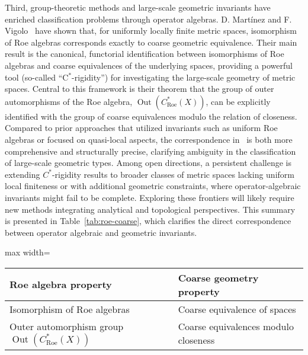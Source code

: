 \documentclass[sigconf]{acmart}
\begin{document}
Third, group-theoretic methods and large-scale geometric invariants have enriched classification problems through operator algebras. D. Martínez and F. Vigolo~\cite{ref52} have shown that, for uniformly locally finite metric spaces, isomorphism of Roe algebras corresponds exactly to coarse geometric equivalence. Their main result is the canonical, functorial identification between isomorphisms of Roe algebras and coarse equivalences of the underlying spaces, providing a powerful tool (so-called ``C$^*$-rigidity'') for investigating the large-scale geometry of metric spaces. Central to this framework is their theorem that the group of outer automorphisms of the Roe algebra, $\operatorname{Out}(C^*_{\mathrm{Roe}}(X))$, can be explicitly identified with the group of coarse equivalences modulo the relation of closeness. Compared to prior approaches that utilized invariants such as uniform Roe algebras or focused on quasi-local aspects, the correspondence in~\cite{ref52} is both more comprehensive and structurally precise, clarifying ambiguity in the classification of large-scale geometric types. Among open directions, a persistent challenge is extending $C^*$-rigidity results to broader classes of metric spaces lacking uniform local finiteness or with additional geometric constraints, where operator-algebraic invariants might fail to be complete. Exploring these frontiers will likely require new methods integrating analytical and topological perspectives. This summary is presented in Table~\ref{tab:roe-coarse}, which clarifies the direct correspondence between operator algebraic and geometric invariants.

\begin{table*}[htbp]
\centering
\caption{Correspondence between Roe algebra and coarse geometric equivalence, as established by Martínez and Vigolo~\cite{ref52}}
\label{tab:roe-coarse}
\begin{adjustbox}{max width=\textwidth}
\begin{tabular}{@{}ll@{}}
\toprule
Roe algebra property & Coarse geometry property \\
\midrule
Isomorphism of Roe algebras & Coarse equivalence of spaces \\
Outer automorphism group $\operatorname{Out}(C^*_{\mathrm{Roe}}(X))$ & Coarse equivalences modulo closeness \\
\bottomrule
\end{tabular}
\end{adjustbox}
\end{table*}
\end{document}
